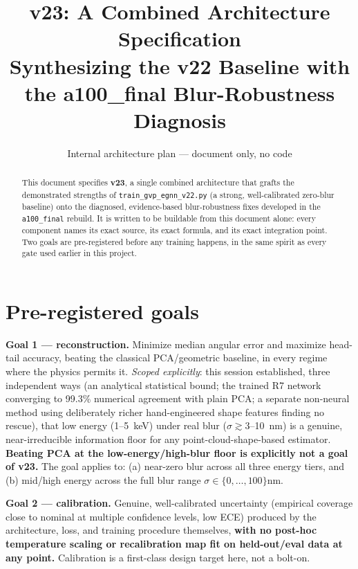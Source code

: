 \documentclass[11pt]{article}
\title{v23: A Combined Architecture Specification\\
\large Synthesizing the v22 Baseline with the a100\_final Blur-Robustness Diagnosis}
\author{Internal architecture plan --- document only, no code}
\date{}
\newcommand{\code}[1]{\texttt{#1}}
\begin{document}
\maketitle

\begin{abstract}
This document specifies \textbf{v23}, a single combined architecture that grafts the
demonstrated strengths of \code{train\_gvp\_egnn\_v22.py} (a strong, well-calibrated
zero-blur baseline) onto the diagnosed, evidence-based blur-robustness fixes developed in
the \code{a100\_final} rebuild. It is written to be buildable from this document alone: every
component names its exact source, its exact formula, and its exact integration point.
Two goals are pre-registered before any training happens, in the same spirit as every gate
used earlier in this project.
\end{abstract}

\tableofcontents

\section{Pre-registered goals}

\textbf{Goal 1 --- reconstruction.} Minimize median angular error and maximize head-tail
accuracy, beating the classical PCA/geometric baseline, in every regime where the physics
permits it. \emph{Scoped explicitly}: this session established, three independent ways
(an analytical statistical bound; the trained R7 network converging to 99.3\% numerical
agreement with plain PCA; a separate non-neural method using deliberately richer
hand-engineered shape features finding no rescue), that low energy (1--5~keV) under real
blur ($\sigma\gtrsim3$--10~nm) is a genuine, near-irreducible information floor for any
point-cloud-shape-based estimator. \textbf{Beating PCA at the low-energy/high-blur floor is
explicitly not a goal of v23.} The goal applies to: (a) near-zero blur across all three
energy tiers, and (b) mid/high energy across the full blur range $\sigma\in\{0,\dots,100\}$nm.

\textbf{Goal 2 --- calibration.} Genuine, well-calibrated uncertainty (empirical coverage
close to nominal at multiple confidence levels, low ECE) produced by the architecture, loss,
and training procedure themselves, \textbf{with no post-hoc temperature scaling or
recalibration map fit on held-out/eval data at any point.} Calibration is a first-class
design target here, not a bolt-on.
\end{document}
